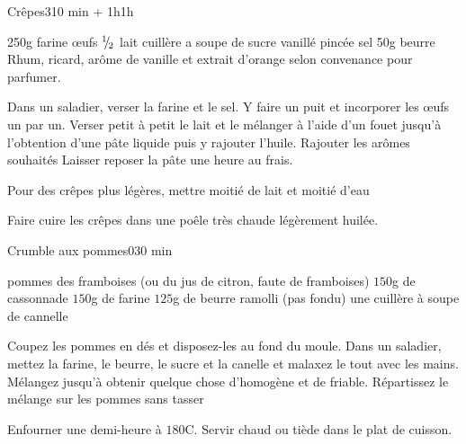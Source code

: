 \begin{recette}{Crêpes}{3}{10 min + 1h}{1h}
\begin{ingredients}
\ingredient 250g farine
 œufs
\ingredient ${{}^{1\!\!}/ _{\!2}}$ lait
 cuillère a soupe de sucre vanillé
 pincée sel
\ingredient 50g beurre
\ingredient Rhum, ricard, arôme de vanille et extrait d'orange selon convenance pour parfumer.
\end{ingredients}


\begin{preparation}
\etape Dans un saladier, verser la farine et le sel.
\etape Y faire un puit et incorporer les œufs un par un.
\etape Verser petit à petit le lait et le mélanger à l'aide d'un fouet jusqu'à l'obtention d'une pâte liquide puis y rajouter l'huile.
\etape Rajouter les arômes souhaités
\etape Laisser reposer la pâte une heure au frais.
\end{preparation}

\begin{remarque}
Pour des crêpes plus légères, mettre moitié de lait et moitié d'eau
\end{remarque}

\begin{cuisson}
Faire cuire les crêpes dans une poêle très chaude légèrement huilée.
\end{cuisson}
\end{recette}

\begin{recette}{Crumble aux pommes}{0}{}{30 min}
\begin{ingredients}
 pommes
\ingredient des framboises (ou du jus de citron, faute de framboises)
\ingredient $150$g de cassonnade
\ingredient $150$g de farine
\ingredient $125$g de beurre ramolli (pas fondu)
\ingredient une cuillère à soupe de cannelle
\end{ingredients}

\begin{preparation}
\etape Coupez les pommes en dés et disposez-les au fond du moule.
\etape Dans un saladier, mettez la farine, le beurre, le sucre et la canelle et malaxez le tout avec les mains. Mélangez jusqu'à obtenir quelque chose d'homogène et de friable.
\etape Répartissez le mélange sur les pommes sans tasser
\end{preparation}

\begin{cuisson}
Enfourner une demi-heure à $180$\degres C. Servir chaud ou tiède dans le plat de cuisson.
\end{cuisson}
\end{recette}


